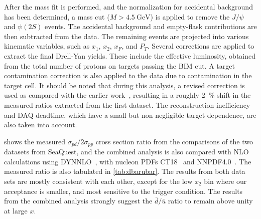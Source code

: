 \documentclass[reprint,aps,unsortedaddress,superscriptaddress,prl,floatfix,showpacs,linenumbers,final]{revtex4-2}
\begin{document}
After the mass fit is performed, and the normalization for accidental background has been determined,
a mass cut ($M>\SI{4.5}{\GeV}$) is applied to remove the $J/\psi$ and $\psi\left(2S\right)$ events.
The accidental background and empty-flask contributions are then subtracted from the data.
The remaining events are projected into various kinematic variables, such as $x_1$, $x_2$, $x_F$, and $P_T$.
Several corrections are applied to extract the final Drell-Yan yields.
These include the effective luminosity, obtained from the total number of protons on targets passing the BIM cut.
A target contamination correction is also applied to the  data due to  contamination in the target cell.
It should be noted that during this analysis,
a revised correction is used as compared with the earlier work~\cite{dove2021,dove2023},
resulting in a roughly \SI{2}{\percent} shift in the measured ratios extracted from the first dataset.
The reconstruction inefficiency and DAQ deadtime, which have a small but non-negligible target dependence,
are also taken into account.


 shows the measured $\sigma_{pd}/2\sigma_{pp}$ cross section ratio from the comparisons
of the two datasets from SeaQuest, and the combined analysis is also compared with
NLO calculations using DYNNLO~\cite{catani2007,catani2009},
with nucleon PDFs CT18~\cite{hou2021} and NNPDF4.0~\cite{ball2022a}.
The measured ratio is also tabulated in \cref{tab:dbarubar}.
The results from both data sets are mostly consistent with each other, except for the low $x_2$ bin where our acceptance is smaller,
and most sensitive to the trigger condition.
The results from the combined analysis strongly suggest the $\bar{d}/\bar{u}$ ratio to remain above unity at large $x$.
\end{document}
